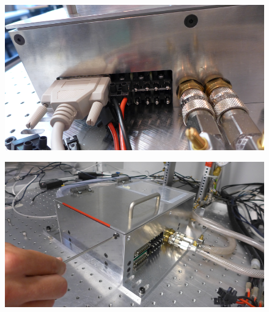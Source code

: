 \documentclass[a4paper,12pt,twoside]{article}
\begin{document}
\begin{appendices}
\begin{itemize}
\end{itemize}
\begin{figure} [h!]
\centering
\begin{minipage}{.48\textwidth}
  \centering
  \includegraphics[width=\textwidth]{./Figures/Point2.png}
  \label{Step2}
\end{minipage}%
\hspace{2mm}
\begin{minipage}{.48\textwidth}
  \centering
  \includegraphics[width=\textwidth]{./Figures/Point4.png}
  \label{Step4}
\end{minipage}
\end{figure}


\end{appendices}
\end{document}
